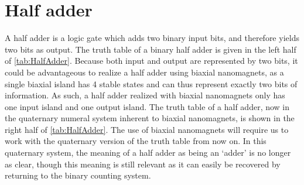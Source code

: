 \documentclass[11pt,a4paper,english]{article}
\begin{document}
\section{Half adder}
\label{par:halfadder}
A half adder is a logic gate which adds two binary input bits, and therefore yields two bits as output. %
The truth table of a binary half adder is given in the left half of \cref{tab:HalfAdder}. Because both input and output are represented by two bits, it could be advantageous to realize a half adder using biaxial nanomagnets, as a single biaxial island has 4 stable states and can thus represent exactly two bits of information. As such, a half adder realized with biaxial nanomagnets only has one input island and one output island. The truth table of a half adder, now in the quaternary numeral system inherent to biaxial nanomagnets, is shown in the right half of \cref{tab:HalfAdder}. The use of biaxial nanomagnets will require us to work with the quaternary version of the truth table from now on. In this quaternary system, the meaning of a half adder as being an `adder' is no longer as clear, though this meaning is still relevant as it can easily be recovered by returning to the binary counting system. \par
{}
\end{document}
